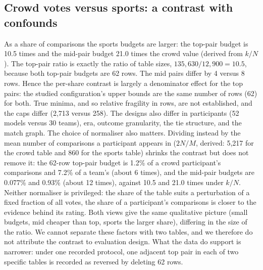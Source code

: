 \documentclass{article}
\begin{document}
\subsection{Crowd votes versus sports: a contrast with confounds}\label{sec:contrast}
As a share of comparisons the sports budgets are larger: the top-pair budget is 10.5 times and the mid-pair budget 21.0 times the crowd value (derived from $k/N$). %
The top-pair ratio is exactly the ratio of table sizes, $135{,}630/12{,}900=10.5$, because both top-pair budgets are 62 rows. The mid pairs differ by 4 versus 8 rows. Hence the per-share contrast is largely a denominator effect for the top pairs: the studied configuration's upper bounds are the same number of rows (62) for both. True minima, and so relative fragility in rows, are not established, and the caps differ (2,713 versus 258). The designs also differ in participants (52 models versus 30 teams), era, outcome granularity, the tie structure, and the match graph. The choice of normaliser also matters. Dividing instead by the mean number of comparisons a participant appears in ($2N/M$, derived: 5,217 for the crowd table and 860 for the sports table) shrinks the contrast but does not remove it: the 62-row top-pair budget is 1.2\% of a crowd participant's comparisons and 7.2\% of a team's (about 6 times), and the mid-pair budgets are 0.077\% and 0.93\% (about 12 times), against 10.5 and 21.0 times under $k/N$. %
Neither normaliser is privileged: the share of the table suits a perturbation of a fixed fraction of all votes, the share of a participant's comparisons is closer to the evidence behind its rating. Both views give the same qualitative picture (small budgets, mid cheaper than top, sports the larger share), differing in the size of the ratio. We cannot separate these factors with two tables, and we therefore do not attribute the contrast to evaluation design. What the data do support is narrower: under one recorded protocol, one adjacent top pair in each of two specific tables is recorded as reversed by deleting 62 rows.
\end{document}
